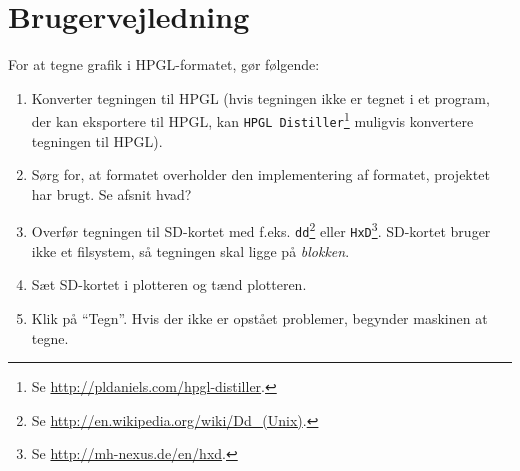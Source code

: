 \chapter{Brugervejledning}
\label{ch:brugervejledning}


For at tegne grafik i HPGL-formatet, gør følgende:

\begin{enumerate}
\item Konverter tegningen til HPGL (hvis tegningen ikke er tegnet i et
  program, der kan eksportere til HPGL, kan \texttt{HPGL
    Distiller}\footnote{Se \url{http://pldaniels.com/hpgl-distiller}.}
  muligvis konvertere tegningen til HPGL).
\item Sørg for, at formatet overholder den implementering af formatet,
  projektet har brugt. Se afsnit hvad?
\item Overfør tegningen til SD-kortet med
  f.eks. \texttt{dd}\footnote{Se
    \url{http://en.wikipedia.org/wiki/Dd_(Unix)}.} eller
  \texttt{HxD}\footnote{Se
    \url{http://mh-nexus.de/en/hxd}.}. SD-kortet bruger ikke et
  filsystem, så tegningen skal ligge på \textit{blokken}.
\item Sæt SD-kortet i plotteren og tænd plotteren.
\item Klik på \enquote{Tegn}. Hvis der ikke er opstået problemer,
  begynder maskinen at tegne.
\end{enumerate}


